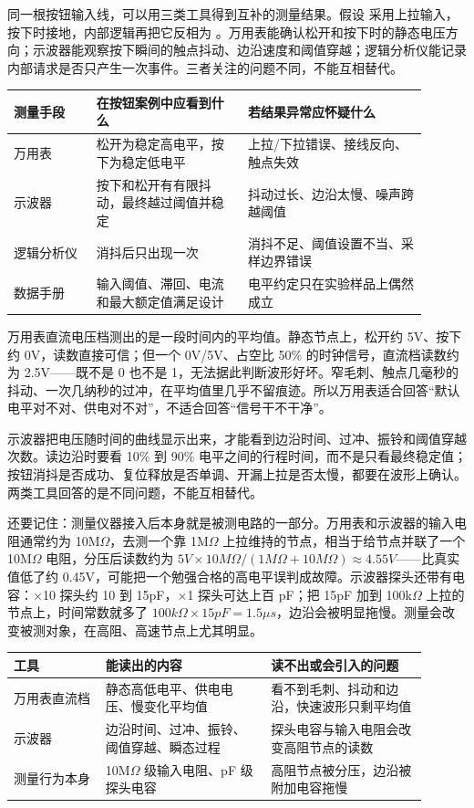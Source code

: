同一根按钮输入线，可以用三类工具得到互补的测量结果。假设  采用上拉输入，按下时接地，内部逻辑再把它反相为 。万用表能确认松开和按下时的静态电压方向；示波器能观察按下瞬间的触点抖动、边沿速度和阈值穿越；逻辑分析仪能记录内部请求是否只产生一次事件。三者关注的问题不同，不能互相替代。

\begin{longtable}{L{0.18\linewidth}L{0.33\linewidth}L{0.39\linewidth}}
\toprule
测量手段 & 在按钮案例中应看到什么 & 若结果异常应怀疑什么 \\
\midrule
万用表 & 松开为稳定高电平，按下为稳定低电平 & 上拉/下拉错误、接线反向、触点失效 \\
示波器 & 按下和松开有有限抖动，最终越过阈值并稳定 & 抖动过长、边沿太慢、噪声跨越阈值 \\
逻辑分析仪 & 消抖后只出现一次  & 消抖不足、阈值设置不当、采样边界错误 \\
数据手册 & 输入阈值、滞回、电流和最大额定值满足设计 & 电平约定只在实验样品上偶然成立 \\
\bottomrule
\end{longtable}

万用表直流电压档测出的是一段时间内的平均值。静态节点上，松开约 5V、按下约 0V，读数直接可信；但一个 0V/5V、占空比 50\% 的时钟信号，直流档读数约为 2.5V——既不是 0 也不是 1，无法据此判断波形好坏。窄毛刺、触点几毫秒的抖动、一次几纳秒的过冲，在平均值里几乎不留痕迹。所以万用表适合回答“默认电平对不对、供电对不对”，不适合回答“信号干不干净”。

示波器把电压随时间的曲线显示出来，才能看到边沿时间、过冲、振铃和阈值穿越次数。读边沿时要看 10\% 到 90\% 电平之间的行程时间，而不是只看最终稳定值；按钮消抖是否成功、复位释放是否单调、开漏上拉是否太慢，都要在波形上确认。两类工具回答的是不同问题，不能互相替代。

还要记住：测量仪器接入后本身就是被测电路的一部分。万用表和示波器的输入电阻通常约为 10M$\Omega$，去测一个靠 1M$\Omega$ 上拉维持的节点，相当于给节点并联了一个 10M$\Omega$ 电阻，分压后读数约为 $5V \times 10M\Omega/(1M\Omega+10M\Omega) \approx 4.55V$——比真实值低了约 0.45V，可能把一个勉强合格的高电平误判成故障。示波器探头还带有电容：$\times$10 探头约 10 到 15pF，$\times$1 探头可达上百 pF；把 15pF 加到 100k$\Omega$ 上拉的节点上，时间常数就多了 $100k\Omega \times 15pF = 1.5\mu s$，边沿会被明显拖慢。测量会改变被测对象，在高阻、高速节点上尤其明显。

\begin{longtable}{L{0.2\linewidth}L{0.36\linewidth}L{0.34\linewidth}}
\toprule
工具 & 能读出的内容 & 读不出或会引入的问题 \\
\midrule
万用表直流档 & 静态高低电平、供电电压、慢变化平均值 & 看不到毛刺、抖动和边沿，快速波形只剩平均值 \\
示波器 & 边沿时间、过冲、振铃、阈值穿越、瞬态过程 & 探头电容与输入电阻会改变高阻节点的读数 \\
测量行为本身 & 10M$\Omega$ 级输入电阻、pF 级探头电容 & 高阻节点被分压，边沿被附加电容拖慢 \\
\bottomrule
\end{longtable}


